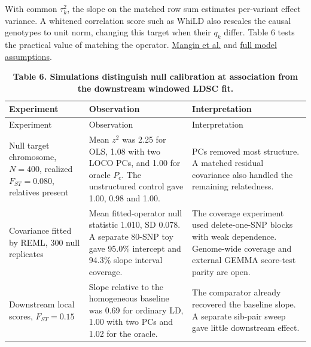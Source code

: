 \documentclass[11pt,a4paper]{article}
\begin{document}
With common \(\tau_k^2\), the slope on the matched row sum estimates per-variant effect variance. A whitened correlation score such as WhiLD also rescales the causal genotypes to unit norm, changing this target when their \(q_k\) differ. Table 6 tests the practical value of matching the operator. \href{https://pubmed.ncbi.nlm.nih.gov/21878986/}{Mangin et al.} and \href{../docs/METHOD.md}{full model assumptions}.

\begin{longtable}[]{@{}
  >{\raggedright\arraybackslash}p{}
  >{\raggedright\arraybackslash}p{}
  >{\raggedright\arraybackslash}p{}@{}}
\caption{\textbf{Table 6. Simulations distinguish null calibration at association from the downstream windowed LDSC fit.}}\tabularnewline
\toprule\noalign{}
\begin{minipage}[b]{\linewidth}\raggedright
Experiment
\end{minipage} & \begin{minipage}[b]{\linewidth}\raggedright
Observation
\end{minipage} & \begin{minipage}[b]{\linewidth}\raggedright
Interpretation
\end{minipage} \\
\midrule\noalign{}
\endfirsthead
\toprule\noalign{}
\begin{minipage}[b]{\linewidth}\raggedright
Experiment
\end{minipage} & \begin{minipage}[b]{\linewidth}\raggedright
Observation
\end{minipage} & \begin{minipage}[b]{\linewidth}\raggedright
Interpretation
\end{minipage} \\
\midrule\noalign{}
\endhead
\bottomrule\noalign{}
\endlastfoot
Null target chromosome, \(N=400\), realized \(F_{ST}=0.080\), relatives present & Mean \(z^2\) was 2.25 for OLS, 1.08 with two LOCO PCs, and 1.00 for oracle \(P_c\). The unstructured control gave 1.00, 0.98 and 1.00. & PCs removed most structure. A matched residual covariance also handled the remaining relatedness. \\
Covariance fitted by REML, 300 null replicates & Mean fitted-operator null statistic 1.010, SD 0.078. A separate 80-SNP toy gave 95.0\% intercept and 94.3\% slope interval coverage. & The coverage experiment used delete-one-SNP blocks with weak dependence. Genome-wide coverage and external GEMMA score-test parity are open. \\
Downstream local scores, \(F_{ST}=0.15\) & Slope relative to the homogeneous baseline was 0.69 for ordinary LD, 1.00 with two PCs and 1.02 for the oracle. & The comparator already recovered the baseline slope. A separate sib-pair sweep gave little downstream effect. \\
\end{longtable}
\end{document}
